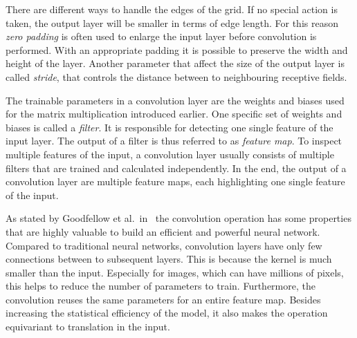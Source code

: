 There are different ways to handle the edges of the grid. If no special action is taken, the output layer will be smaller in terms of edge length. For this reason \emph{zero padding} is often used to enlarge the input layer before convolution is performed. With an appropriate padding it is possible to preserve the width and height of the layer. Another parameter that affect the size of the output layer is called \emph{stride}, that controls the distance between to neighbouring receptive fields.~\cite[p.~361]{praxiseinstieg_ml17}

The trainable parameters in a convolution layer are the weights and biases used for the matrix multiplication introduced earlier. One specific set of weights and biases is called a \emph{filter}. It is responsible for detecting one single feature of the input layer. The output of a filter is thus referred to as \emph{feature map}. To inspect multiple features of the input, a convolution layer usually consists of multiple filters that are trained and calculated independently. In the end, the output of a convolution layer are multiple feature maps, each highlighting one single feature of the input.~\cite[p.~363 f]{praxiseinstieg_ml17}

As stated by Goodfellow et al.\ in~\cite{DLbook16} the convolution operation has some properties that are highly valuable to build an efficient and powerful neural network. Compared to traditional neural networks, convolution layers have only few connections between to subsequent layers. This is because the kernel is much smaller than the input. Especially for images, which can have millions of pixels, this helps to reduce the number of parameters to train.  Furthermore, the convolution reuses the same parameters for an entire feature map. Besides increasing the statistical efficiency of the model, it also makes the operation equivariant to translation in the input.

